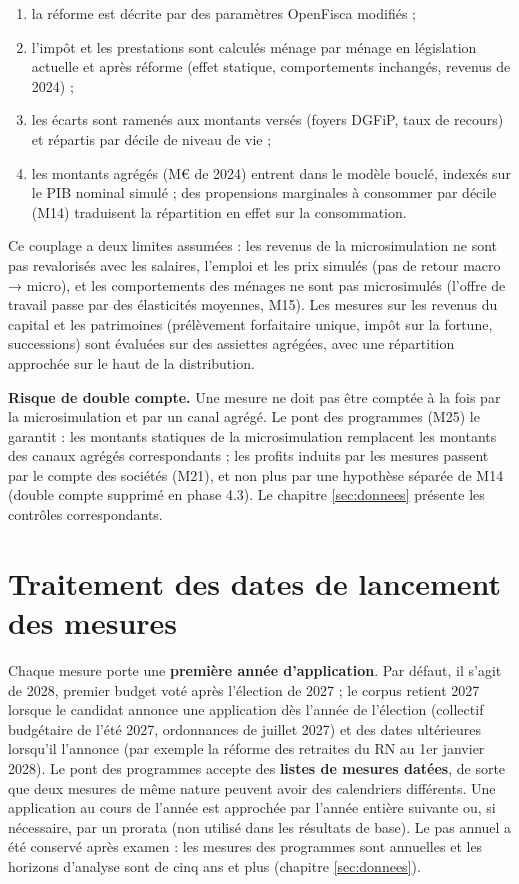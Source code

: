 \documentclass[
  11pt,
  11pt,
  a4paper,
  openany]{book}
\providecommand{\tightlist}{%
  \setlength{\itemsep}{0pt}\setlength{\parskip}{0pt}}
\begin{document}
\begin{enumerate}
\def\labelenumi{\arabic{enumi}.}
\tightlist
\item
  la réforme est décrite par des paramètres OpenFisca modifiés ;
\item
  l'impôt et les prestations sont calculés ménage par ménage en
  législation actuelle et après réforme (effet statique, comportements
  inchangés, revenus de 2024) ;
\item
  les écarts sont ramenés aux montants versés (foyers DGFiP, taux de
  recours) et répartis par décile de niveau de vie ;
\item
  les montants agrégés (M€ de 2024) entrent dans le modèle bouclé,
  indexés sur le PIB nominal simulé ; des propensions marginales à
  consommer par décile (M14) traduisent la répartition en effet sur la
  consommation.
\end{enumerate}

Ce couplage a deux limites assumées : les revenus de la microsimulation
ne sont pas revalorisés avec les salaires, l'emploi et les prix simulés
(pas de retour macro → micro), et les comportements des ménages ne sont
pas microsimulés (l'offre de travail passe par des élasticités moyennes,
M15). Les mesures sur les revenus du capital et les patrimoines
(prélèvement forfaitaire unique, impôt sur la fortune, successions) sont
évaluées sur des assiettes agrégées, avec une répartition approchée sur
le haut de la distribution.

\textbf{Risque de double compte.} Une mesure ne doit pas être comptée à
la fois par la microsimulation et par un canal agrégé. Le pont des
programmes (M25) le garantit : les montants statiques de la
microsimulation remplacent les montants des canaux agrégés
correspondants ; les profits induits par les mesures passent par le
compte des sociétés (M21), et non plus par une hypothèse séparée de M14
(double compte supprimé en phase 4.3). Le chapitre \ref{sec:donnees}
présente les contrôles correspondants.

\hypertarget{sec:dates}{%
\section{Traitement des dates de lancement des
mesures}\label{sec:dates}}

Chaque mesure porte une \textbf{première année d'application}. Par
défaut, il s'agit de 2028, premier budget voté après l'élection de 2027
; le corpus retient 2027 lorsque le candidat annonce une application dès
l'année de l'élection (collectif budgétaire de l'été 2027, ordonnances
de juillet 2027) et des dates ultérieures lorsqu'il l'annonce (par
exemple la réforme des retraites du RN au 1er janvier 2028). Le pont des
programmes accepte des \textbf{listes de mesures datées}, de sorte que
deux mesures de même nature peuvent avoir des calendriers différents.
Une application au cours de l'année est approchée par l'année entière
suivante ou, si nécessaire, par un prorata (non utilisé dans les
résultats de base). Le pas annuel a été conservé après examen : les
mesures des programmes sont annuelles et les horizons d'analyse sont de
cinq ans et plus (chapitre \ref{sec:donnees}).
\end{document}
